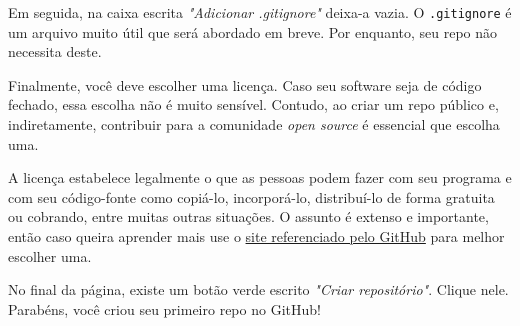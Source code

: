 \documentclass{article}
\begin{document}
	Em seguida, na caixa escrita \textit{"Adicionar .gitignore"} deixa-a vazia. O \texttt{.gitignore} é um arquivo muito útil 
	que será abordado em breve. Por enquanto, seu repo não necessita deste. 
	
	Finalmente, você deve escolher uma licença. Caso seu software seja de código fechado, essa escolha não é muito sensível.
	Contudo, ao criar um repo público e, indiretamente, contribuir para a comunidade \textit{open source} é essencial que escolha 
	uma.

	A licença estabelece legalmente o que as pessoas podem fazer com seu programa e com seu código-fonte como copiá-lo, incorporá-lo,
	distribuí-lo de forma gratuita ou cobrando, entre muitas outras situações. O assunto é extenso e importante, então caso queira 
	aprender mais use o \href{https://choosealicense.com/}{site referenciado pelo GitHub} para melhor escolher uma.

	No final da página, existe um botão verde escrito \textit{"Criar repositório"}. Clique nele. Parabéns, você criou seu primeiro 
	repo no GitHub!
\end{document}
